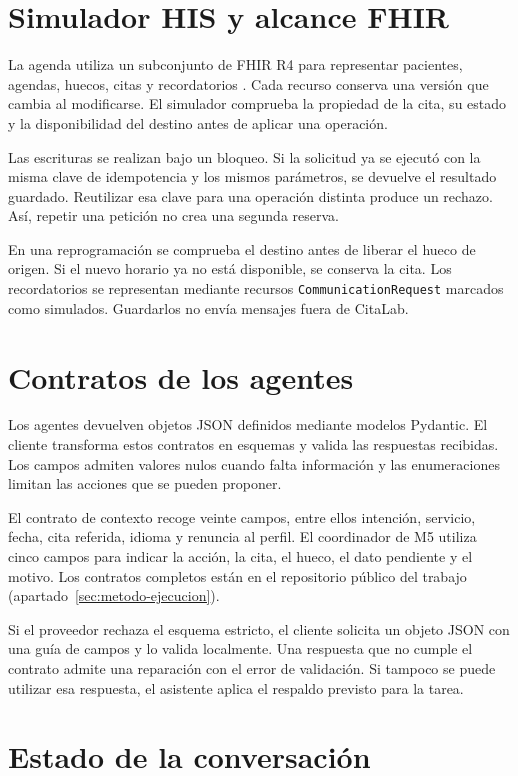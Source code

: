 \section{Simulador HIS y alcance FHIR}

La agenda utiliza un subconjunto de FHIR R4 para representar pacientes,
agendas, huecos, citas y recordatorios \citep{fhirR4}. Cada recurso conserva
una versión que cambia al modificarse. El simulador comprueba la propiedad de
la cita, su estado y la disponibilidad del destino antes de aplicar una operación.

Las escrituras se realizan bajo un bloqueo. Si la solicitud ya se ejecutó con
la misma clave de idempotencia y los mismos parámetros, se devuelve el resultado
guardado. Reutilizar esa clave para una operación distinta produce un rechazo.
Así, repetir una petición no crea una segunda reserva.

En una reprogramación se comprueba el destino antes de liberar el hueco de
origen. Si el nuevo horario ya no está disponible, se conserva la cita. Los
recordatorios se representan mediante recursos \texttt{CommunicationRequest}
marcados como simulados. Guardarlos no envía mensajes fuera de CitaLab.

\section{Contratos de los agentes}

Los agentes devuelven objetos JSON definidos mediante modelos Pydantic. El
cliente transforma estos contratos en esquemas y valida las respuestas recibidas.
Los campos admiten valores nulos cuando falta información y las enumeraciones
limitan las acciones que se pueden proponer.

El contrato de contexto recoge veinte campos, entre ellos intención, servicio,
fecha, cita referida, idioma y renuncia al perfil. El coordinador de M5 utiliza
cinco campos para indicar la acción, la cita, el hueco, el dato pendiente y el
motivo. Los contratos completos están en el repositorio público del trabajo
(apartado~\ref{sec:metodo-ejecucion}).

Si el proveedor rechaza el esquema estricto, el cliente solicita un objeto JSON
con una guía de campos y lo valida localmente. Una respuesta que no cumple el
contrato admite una reparación con el error de validación. Si tampoco se puede
utilizar esa respuesta, el asistente aplica el respaldo previsto para la tarea.

\section{Estado de la conversación}

